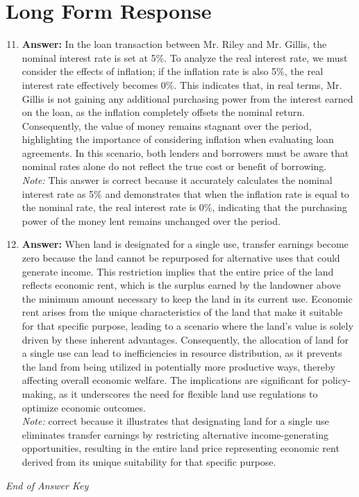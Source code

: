 \documentclass[12pt]{article}
\begin{document}
\section*{Long Form Response}
\begin{enumerate}[label=\arabic*.]
\setcounter{enumi}{10}
\item \textbf{Answer:} In the loan transaction between Mr. Riley and Mr. Gillis, the nominal interest rate is set at 5\%. To analyze the real interest rate, we must consider the effects of inflation; if the inflation rate is also 5\%, the real interest rate effectively becomes 0\%. This indicates that, in real terms, Mr. Gillis is not gaining any additional purchasing power from the interest earned on the loan, as the inflation completely offsets the nominal return. Consequently, the value of money remains stagnant over the period, highlighting the importance of considering inflation when evaluating loan agreements. In this scenario, both lenders and borrowers must be aware that nominal rates alone do not reflect the true cost or benefit of borrowing.
\\ \textit{Note:} This answer is correct because it accurately calculates the nominal interest rate as 5\% and demonstrates that when the inflation rate is equal to the nominal rate, the real interest rate is 0\%, indicating that the purchasing power of the money lent remains unchanged over the period.
\item \textbf{Answer:} When land is designated for a single use, transfer earnings become zero because the land cannot be repurposed for alternative uses that could generate income. This restriction implies that the entire price of the land reflects economic rent, which is the surplus earned by the landowner above the minimum amount necessary to keep the land in its current use. Economic rent arises from the unique characteristics of the land that make it suitable for that specific purpose, leading to a scenario where the land's value is solely driven by these inherent advantages. Consequently, the allocation of land for a single use can lead to inefficiencies in resource distribution, as it prevents the land from being utilized in potentially more productive ways, thereby affecting overall economic welfare. The implications are significant for policy-making, as it underscores the need for flexible land use regulations to optimize economic outcomes.
\\ \textit{Note:} correct because it illustrates that designating land for a single use eliminates transfer earnings by restricting alternative income-generating opportunities, resulting in the entire land price representing economic rent derived from its unique suitability for that specific purpose.
\end{enumerate}

\vfill
\noindent\textit{End of Answer Key}
\end{document}
